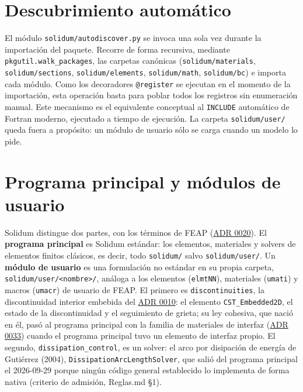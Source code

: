 \documentclass[11pt,oneside]{report}
\begin{document}
\section{Descubrimiento automático}

El módulo \texttt{solidum/\allowbreak{}autodiscover.\allowbreak{}py} se invoca una sola vez durante la importación del paquete. Recorre de forma recursiva, mediante \texttt{pkgutil.\allowbreak{}walk\_\allowbreak{}packages}, las carpetas canónicas (\texttt{solidum/\allowbreak{}materials}, \texttt{solidum/sections}, \texttt{solidum/elements}, \texttt{solidum/math}, \texttt{solidum/bc}) e importa cada módulo. Como los decoradores \texttt{@register} se ejecutan en el momento de la importación, esta operación basta para poblar todos los registros sin enumeración manual. Este mecanismo es el equivalente conceptual al \texttt{INCLUDE} automático de Fortran moderno, ejecutado a tiempo de ejecución. La carpeta \texttt{solidum/user/} queda fuera a propósito: un módulo de usuario sólo se carga cuando un modelo lo pide.

\section{Programa principal y módulos de usuario}

Solidum distingue dos partes, con los términos de FEAP (\hyperref[adr:0020]{ADR 0020}). El \textbf{programa principal} es Solidum estándar: los elementos, materiales y solvers de elementos finitos clásicos, es decir, todo \texttt{solidum/} salvo \texttt{solidum/user/}. Un \textbf{módulo de usuario} es una formulación no estándar en su propia carpeta, \texttt{solidum/\allowbreak{}user/\allowbreak{}\textless{}nombre\textgreater{}/\allowbreak{}}, análoga a los elementos (\texttt{elmtNN}), materiales (\texttt{umati}) y macros (\texttt{umacr}) de usuario de FEAP. El primero es \texttt{discontinuities}, la discontinuidad interior embebida del \hyperref[adr:0010]{ADR 0010}: el elemento \texttt{CST\_Embedded2D}, el estado de la discontinuidad y el seguimiento de grieta; su ley cohesiva, que nació en él, pasó al programa principal con la familia de materiales de interfaz (\hyperref[adr:0033]{ADR 0033}) cuando el programa principal tuvo un elemento de interfaz propio. El segundo, \texttt{dissipation\_\allowbreak{}control}, es un solver: el arco por disipación de energía de Gutiérrez (2004), \texttt{DissipationArcLengthSolver}, que salió del programa principal el 2026-09-29 porque ningún código general establecido lo implementa de forma nativa (criterio de admisión, Reglas.md §1).
\end{document}
